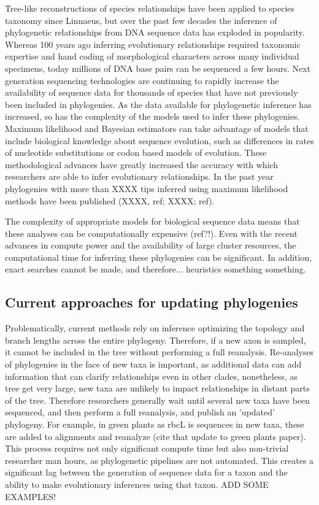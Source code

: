 \documentclass[10pt]{article}
\begin{document}
Tree-like reconstructions of species relationships have been applied to species taxonomy since Linnaeus, but over the past few decades the inference of phylogenetic relationships from DNA sequence data has exploded in popularity. Whereas 100 years ago inferring evolutionary relationships required taxonomic expertise and hand coding of morphological characters across many individual specimens, today millions of DNA base pairs can be sequenced a few hours. Next generation sequencing technologies are continuing to rapidly increase the availability of sequence data for thousands of species that have not previously been included in phylogenies. As the data available for phylogenetic inference has increased, so has the complexity of the models used to infer these phylogenies. Maximum likelihood and Bayesian estimators can take advantage of models that include biological knowledge about sequence evolution, such as differences in rates of nucleotide substitutions or codon based models of evolution. These methodological advances have greatly increased the accuracy with which researchers are able to infer evolutionary relationships. In the past year phylogenies with more than XXXX tips inferred using maximum likelihood methods have been published (XXXX, ref; XXXX; ref).

The complexity of appropriate models for biological sequence data means that these analyses can be computationally expensive (ref?!). Even with the recent advances in compute power and the availability of large cluster resources, the computational time for inferring these phylogenies can be significant. In addition, exact searches cannot be made, and therefore... heuristics something something.


\subsection*{Current approaches for updating phylogenies}

Problematically, current methods rely on inference optimizing the topology and branch lengths across the entire phylogeny. Therefore, if a new axon is sampled, it cannot be included in the tree without performing a full reanalysis.  Re-analyses of phylogenies in the face of new taxa is important, as additional data can add information that can clarify relationships even in other clades, nonetheless, as tree get very large, new taxa are unlikely to impact relationships in distant parts of the tree. Therefore researchers generally wait until several new taxa have been sequenced, and then perform a full reanalysis, and publish an 'updated' phylogeny. For example, in green plants as rbcL is sequences in new taxa, these are added to alignments and reanalyze (cite that update to green plants paper). This process requires not only significant compute time but also non-trivial researcher man hours, as phylogenetic pipelines are not automated. This creates a significant lag between the generation of sequence data for a taxon and the ability to make evolutionary inferences using that taxon.
ADD SOME EXAMPLES!
\end{document}
